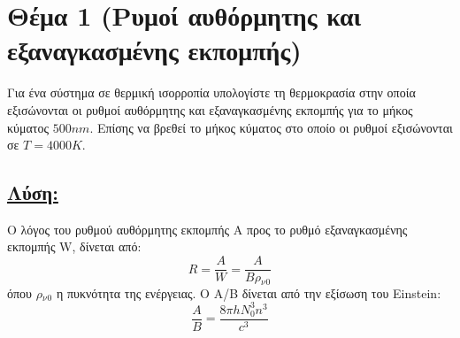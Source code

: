 \documentclass[a4paper,11pt,titlepage]{article}
\begin{document}







\newpage
\section{Θέμα 1 (Ρυμοί αυθόρμητης και εξαναγκασμένης εκπομπής)}
Για ένα σύστημα σε θερμική ισορροπία υπολογίστε τη θερμοκρασία στην οποία εξισώνονται οι ρυθμοί αυθόρμητης και εξαναγκασμένης εκπομπής για το μήκος κύματος $500nm$. Επίσης να βρεθεί το μήκος κύματος στο οποίο οι ρυθμοί εξισώνονται σε $T=4000K$.

\subsection*{\underline{Λύση:}}

Ο λόγος του ρυθμού αυθόρμητης εκπομπής Α προς το ρυθμό εξαναγκασμένης εκπομπής W, δίνεται από:
\begin{equation}
 R=\dfrac{A}{W}=\dfrac{A}{B\rho{_\nu{_0}}}
\end{equation}
όπου $\rho{_\nu{_0}}$ η πυκνότητα της ενέργειας. Ο A/B δίνεται από την εξίσωση του Einstein:
\begin{equation}
 \frac{A}{B}=\frac{8{\pi}hN_0^3n^3}{c^3}
\end{equation}
\end{document}
